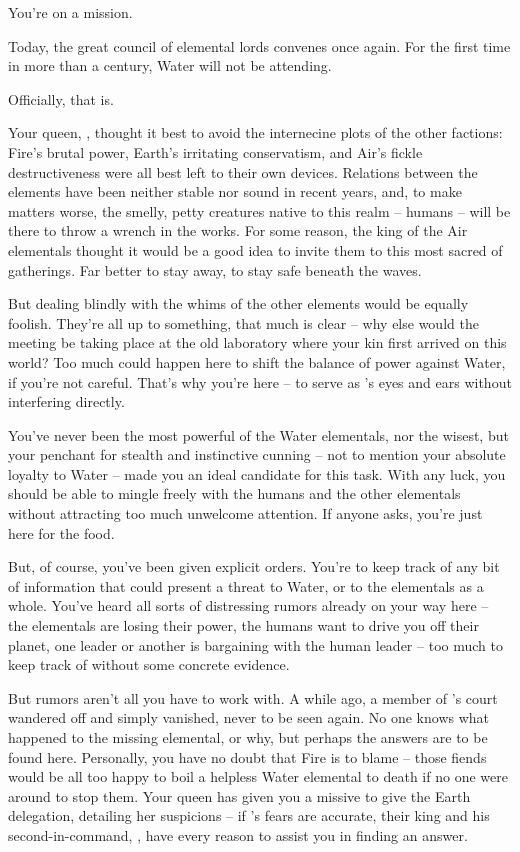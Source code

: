 \documentclass[char]{elementals}
\begin{document}
\name{\cMiniWater{}}


You're on a mission. 

Today, the great council of elemental lords convenes once again. For the first time in more than a century, Water will not be attending.

Officially, that is.

Your queen, \cWaterQueen{}, thought it best to avoid the internecine plots of the other factions: Fire's brutal power, Earth's irritating conservatism, and Air's fickle destructiveness were all best left to their own devices. Relations between the elements have been neither stable nor sound in recent years, and, to make matters worse, the smelly, petty creatures native to this realm -- humans -- will be there to throw a wrench in the works. For some reason, the king of the Air elementals thought it would be a good idea to invite them to this most sacred of gatherings. Far better to stay away, to stay safe beneath the waves.

But dealing blindly with the whims of the other elements would be equally foolish. They're all up to something, that much is clear -- why else would the meeting be taking place at the old laboratory where your kin first arrived on this world? Too much could happen here to shift the balance of power against Water, if you're not careful. That's why you're here -- to serve as \cWaterQueen{}'s eyes and ears without interfering directly.

You've never been the most powerful of the Water elementals, nor the wisest, but your penchant for stealth and instinctive cunning -- not to mention your absolute loyalty to Water -- made you an ideal candidate for this task. With any luck, you should be able to mingle freely with the humans and the other elementals without attracting too much unwelcome attention. If anyone asks, you're just here for the food.

But, of course, you've been given explicit orders. You're to keep track of any bit of information that could present a threat to Water, or to the elementals as a whole. You've heard all sorts of distressing rumors already on your way here -- the elementals are losing their power, the humans want to drive you off their planet, one leader or another is bargaining with the human leader -- too much to keep track of without some concrete evidence.

But rumors aren't all you have to work with. A while ago, a member of \cWaterQueen{}'s court wandered off and simply vanished, never to be seen again. No one knows what happened to the missing elemental, or why, but perhaps the answers are to be found here. Personally, you have no doubt that Fire is to blame -- those fiends would be all too happy to boil a helpless Water elemental to death if no one were around to stop them. Your queen has given you a missive to give the Earth delegation, detailing her suspicions -- if \cWaterQueen{}'s fears are accurate, their king and his second-in-command, \cLoyal{\intro}, have every reason to assist you in finding an answer. 
\end{document}
